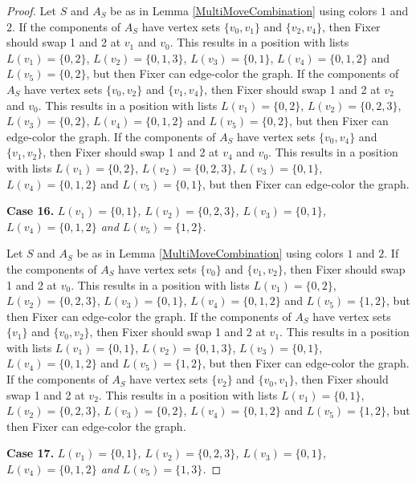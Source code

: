 \documentclass[12pt]{amsart}
\theoremstyle{plain}
\theoremstyle{definition}
\theoremstyle{remark}
\begin{document}
\begin{proof}
Let $S$ and $A_S$ be as in Lemma \ref{MultiMoveCombination} using colors $1$ and $2$. If the components of $A_S$ have vertex sets $\{v_0, v_1\}$ and $\{v_2, v_4\}$, then Fixer should swap 1 and 2 at $v_1$ and $v_0$. This results in a position with lists $L(v_1) = \{0, 2\}$, $L(v_2) = \{0, 1, 3\}$, $L(v_3) = \{0, 1\}$, $L(v_4) = \{0, 1, 2\}$ and $L(v_5) = \{0, 2\}$, but then Fixer can edge-color the graph.
If the components of $A_S$ have vertex sets $\{v_0, v_2\}$ and $\{v_1, v_4\}$, then Fixer should swap 1 and 2 at $v_2$ and $v_0$. This results in a position with lists $L(v_1) = \{0, 2\}$, $L(v_2) = \{0, 2, 3\}$, $L(v_3) = \{0, 2\}$, $L(v_4) = \{0, 1, 2\}$ and $L(v_5) = \{0, 2\}$, but then Fixer can edge-color the graph.
If the components of $A_S$ have vertex sets $\{v_0, v_4\}$ and $\{v_1, v_2\}$, then Fixer should swap 1 and 2 at $v_4$ and $v_0$. This results in a position with lists $L(v_1) = \{0, 2\}$, $L(v_2) = \{0, 2, 3\}$, $L(v_3) = \{0, 1\}$, $L(v_4) = \{0, 1, 2\}$ and $L(v_5) = \{0, 1\}$, but then Fixer can edge-color the graph.

\noindent\textbf{Case 16.  }\textit{$L(v_1) = \{0, 1\}$, $L(v_2) = \{0, 2, 3\}$, $L(v_3) = \{0, 1\}$, $L(v_4) = \{0, 1, 2\}$ and $L(v_5) = \{1, 2\}$.}

Let $S$ and $A_S$ be as in Lemma \ref{MultiMoveCombination} using colors $1$ and $2$. If the components of $A_S$ have vertex sets $\{v_0\}$ and $\{v_1, v_2\}$, then Fixer should swap 1 and 2 at $v_0$. This results in a position with lists $L(v_1) = \{0, 2\}$, $L(v_2) = \{0, 2, 3\}$, $L(v_3) = \{0, 1\}$, $L(v_4) = \{0, 1, 2\}$ and $L(v_5) = \{1, 2\}$, but then Fixer can edge-color the graph.
If the components of $A_S$ have vertex sets $\{v_1\}$ and $\{v_0, v_2\}$, then Fixer should swap 1 and 2 at $v_1$. This results in a position with lists $L(v_1) = \{0, 1\}$, $L(v_2) = \{0, 1, 3\}$, $L(v_3) = \{0, 1\}$, $L(v_4) = \{0, 1, 2\}$ and $L(v_5) = \{1, 2\}$, but then Fixer can edge-color the graph.
If the components of $A_S$ have vertex sets $\{v_2\}$ and $\{v_0, v_1\}$, then Fixer should swap 1 and 2 at $v_2$. This results in a position with lists $L(v_1) = \{0, 1\}$, $L(v_2) = \{0, 2, 3\}$, $L(v_3) = \{0, 2\}$, $L(v_4) = \{0, 1, 2\}$ and $L(v_5) = \{1, 2\}$, but then Fixer can edge-color the graph.

\noindent\textbf{Case 17.  }\textit{$L(v_1) = \{0, 1\}$, $L(v_2) = \{0, 2, 3\}$, $L(v_3) = \{0, 1\}$, $L(v_4) = \{0, 1, 2\}$ and $L(v_5) = \{1, 3\}$.}


\end{proof}
\end{document}

